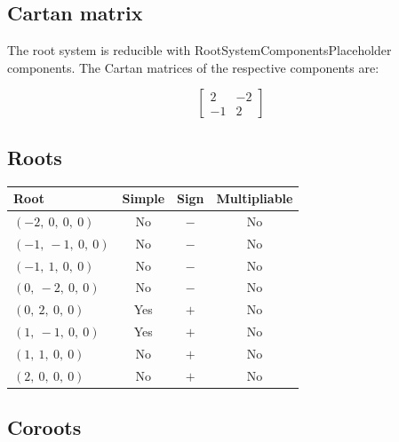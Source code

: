 \documentclass[11pt]{article}
\theoremstyle{definition}
\newif\ifrootsystemirreducible
\begin{document}
\subsection{Cartan matrix}

\ifrootsystemirreducible
The root system is irreducible and has Cartan matrix:
\else
The root system is reducible with RootSystemComponentsPlaceholder components. The Cartan matrices of the respective components are:
\fi

\[
\left[\begin{matrix}2 & -2\\-1 & 2\end{matrix}\right]
\]

\subsection{Roots}

\begin{tabular}{|l|c|c|c|}
    \hline
    \textbf{Root} & \textbf{Simple} & \textbf{Sign} & \textbf{Multipliable} \\
    \hline
    $\left( -2, \  0, \  0, \  0\right)$ & No & $-$ & No \\
    \hline
    $\left( -1, \  -1, \  0, \  0\right)$ & No & $-$ & No \\
    \hline
    $\left( -1, \  1, \  0, \  0\right)$ & No & $-$ & No \\
    \hline
    $\left( 0, \  -2, \  0, \  0\right)$ & No & $-$ & No \\
    \hline
    $\left( 0, \  2, \  0, \  0\right)$ & Yes & $+$ & No \\
    \hline
    $\left( 1, \  -1, \  0, \  0\right)$ & Yes & $+$ & No \\
    \hline
    $\left( 1, \  1, \  0, \  0\right)$ & No & $+$ & No \\
    \hline
    $\left( 2, \  0, \  0, \  0\right)$ & No & $+$ & No \\
    \hline
\end{tabular}


\subsection{Coroots}
\end{document}
